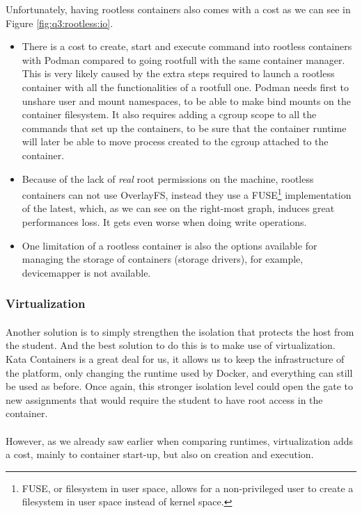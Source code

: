 Unfortunately, having rootless containers also comes with a cost as we can see in Figure \ref{fig:q3:rootless:io}.
\begin{itemize}
  \item There is a cost to create, start and execute command into rootless containers with Podman compared to going rootfull with the same container manager.  This is very likely caused by the extra steps required to launch a rootless container with all the functionalities of a rootfull one.  Podman needs first to unshare user and mount namespaces, to be able to make bind mounts on the container filesystem.  It also requires adding a cgroup scope to all the commands that set up the containers, to be sure that the container runtime will later be able to move process created to the cgroup attached to the container.
  \item Because of the lack of \textit{real} root permissions on the machine, rootless containers can not use OverlayFS, instead they use a FUSE\footnote{FUSE, or filesystem in user space, allows for a non-privileged user to create a filesystem in user space instead of kernel space.} implementation of the latest, which, as we can see on the right-most graph, induces great performances loss.  It gets even worse when doing write operations.
  \item One limitation of a rootless container is also the options available for managing the storage of containers (storage drivers), for example, devicemapper is not available.
\end{itemize}

\subsubsection{Virtualization}
\paragraph{}Another solution is to simply strengthen the isolation that protects the host from the student.  And the best solution to do this is to make use of virtualization.  Kata Containers is a great deal for us, it allows us to keep the infrastructure of the platform, only changing the runtime used by Docker, and everything can still be used as before.  Once again, this stronger isolation level could open the gate to new assignments that would require the student to have root access in the container.

\paragraph{}However, as we already saw earlier when comparing runtimes, virtualization adds a cost, mainly to container start-up, but also on creation and execution.

